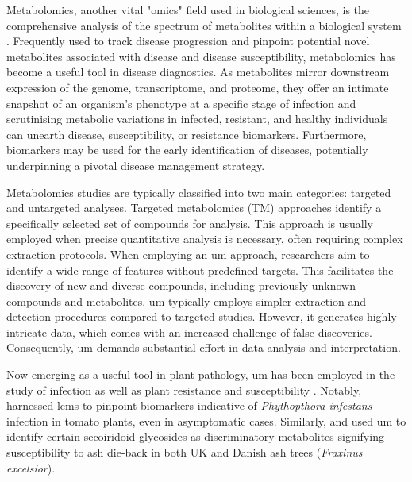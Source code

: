 Metabolomics, another vital "omics" field used in biological sciences, is the comprehensive analysis of the spectrum of metabolites within a biological system \parencite{Klassen2017}. Frequently used to track disease progression and pinpoint potential novel metabolites associated with disease and disease susceptibility, metabolomics has become a useful tool in disease diagnostics. As metabolites mirror downstream expression of the genome, transcriptome, and proteome, they offer an intimate snapshot of an organism's phenotype at a specific stage of infection and scrutinising metabolic variations in infected, resistant, and healthy individuals can unearth disease, susceptibility, or resistance biomarkers. Furthermore, biomarkers may be used for the early identification of diseases, potentially underpinning a pivotal disease management strategy. 

Metabolomics studies are typically classified into two main categories: targeted and untargeted analyses. Targeted metabolomics (TM) approaches identify a specifically selected set of compounds for analysis. This approach is usually employed when precise quantitative analysis is necessary, often requiring complex extraction protocols. When employing an \ac{um} approach, researchers aim to identify a wide range of features without predefined targets. This facilitates the discovery of new and diverse compounds, including previously unknown compounds and metabolites. \ac{um} typically employs simpler extraction and detection procedures compared to targeted studies. However, it generates highly intricate data, which comes with an increased challenge of false discoveries. Consequently, \ac{um} demands substantial effort in data analysis and interpretation.

Now emerging as a useful tool in plant pathology, \ac{um} has been employed in the study of infection as well as plant resistance and susceptibility \parencite{Allwood2021}. Notably, \textcite{Garcia2018} harnessed \ac{lcms} to pinpoint biomarkers indicative of \textit{Phythopthora infestans} infection in tomato plants, even in asymptomatic cases. Similarly, \textcite{Sambles2017} and \textcite{Sidda2020} used \ac{um} to identify certain secoiridoid glycosides as discriminatory metabolites signifying susceptibility to ash die-back in both UK and Danish ash trees (\textit{Fraxinus excelsior}).

